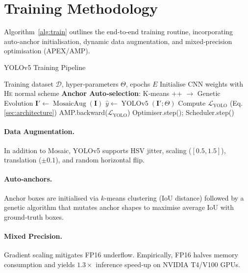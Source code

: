 \documentclass[12pt,a4paper]{article}
\begin{document}
\section{Training Methodology}
\label{sec:training}

Algorithm~\ref{alg:train} outlines the end‑to‑end training routine, incorporating auto‑anchor initialisation, dynamic data augmentation, and mixed‑precision optimisation (APEX/AMP).

\begin{algorithm}[ht]
  \caption{YOLOv5 Training Pipeline}
  \label{alg:train}
  \begin{algorithmic}[1]
    \Require Training dataset $\mathcal{D}$, hyper‑parameters $\Theta$, epochs $E$
    \State Initialise CNN weights with \textsc{He} normal scheme
    \State \textbf{Anchor Auto‑selection}: K‑means ++ $\rightarrow$ Genetic Evolution
        \State $\mathbf{I}' \gets \operatorname{MosaicAug}(\mathbf{I})$  
        \State $\hat{y} \gets \operatorname{YOLOv5}(\mathbf{I}';\Theta)$
        \State Compute $\mathcal{L}_{\text{YOLO}}$ (Eq.\,\ref{sec:architecture})
        \State AMP.backward\bigl($\mathcal{L}_{\text{YOLO}}$\bigr)  
        \State Optimiser.step(); Scheduler.step()
      \EndFor
    \EndFor
  \end{algorithmic}
\end{algorithm}

\paragraph{Data Augmentation.} In addition to Mosaic, YOLOv5 supports HSV jitter, scaling ($[0.5,1.5]$), translation ($\pm0.1$), and random horizontal flip.

\paragraph{Auto‑anchors.} Anchor boxes are initialised via $k$‑means clustering (IoU distance) followed by a genetic algorithm that mutates anchor shapes to maximise average IoU with ground‑truth boxes.

\paragraph{Mixed Precision.} Gradient scaling mitigates FP16 underflow. Empirically, FP16 halves memory consumption and yields $1.3\times$ inference speed‑up on NVIDIA T4/V100 GPUs.
\end{document}
